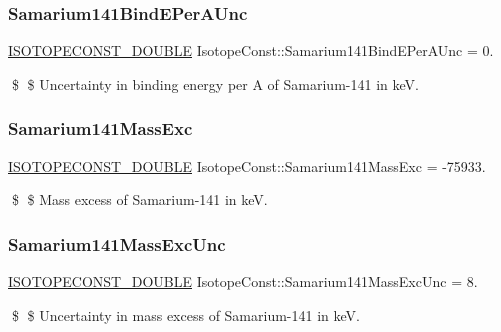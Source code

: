 \subsubsection{\texorpdfstring{Samarium141\+Bind\+E\+Per\+A\+Unc}{Samarium141BindEPerAUnc}}
{\footnotesize\ttfamily \mbox{\hyperlink{group___isotope_const-_macros_ga8f45a7272ce02c0b4c65c44636ed719a}{I\+S\+O\+T\+O\+P\+E\+C\+O\+N\+S\+T\+\_\+\+D\+O\+U\+B\+LE}} Isotope\+Const\+::\+Samarium141\+Bind\+E\+Per\+A\+Unc = 0.}

\$ \$ Uncertainty in binding energy per A of Samarium-\/141 in keV. \mbox{\label{group___isotope_const-_samarium-_sm141_ga5100cdb9af2b0278ef25aa48540d993b}} 
\subsubsection{\texorpdfstring{Samarium141\+Mass\+Exc}{Samarium141MassExc}}
{\footnotesize\ttfamily \mbox{\hyperlink{group___isotope_const-_macros_ga8f45a7272ce02c0b4c65c44636ed719a}{I\+S\+O\+T\+O\+P\+E\+C\+O\+N\+S\+T\+\_\+\+D\+O\+U\+B\+LE}} Isotope\+Const\+::\+Samarium141\+Mass\+Exc = -\/75933.}

\$ \$ Mass excess of Samarium-\/141 in keV. \mbox{\label{group___isotope_const-_samarium-_sm141_ga508490c81d4c800bc83010d7fe97db4d}} 
\subsubsection{\texorpdfstring{Samarium141\+Mass\+Exc\+Unc}{Samarium141MassExcUnc}}
{\footnotesize\ttfamily \mbox{\hyperlink{group___isotope_const-_macros_ga8f45a7272ce02c0b4c65c44636ed719a}{I\+S\+O\+T\+O\+P\+E\+C\+O\+N\+S\+T\+\_\+\+D\+O\+U\+B\+LE}} Isotope\+Const\+::\+Samarium141\+Mass\+Exc\+Unc = 8.}

\$ \$ Uncertainty in mass excess of Samarium-\/141 in keV. \mbox{\label{group___isotope_const-_samarium-_sm141_ga5336cfff89cb448ca250940275651aa4}} 
